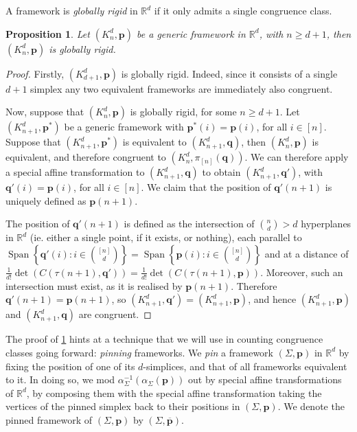 \documentclass[11pt]{amsart}
\newtheorem{proposition}[theorem]{Proposition}
\theoremstyle{definition}
\theoremstyle{remark}
\DeclareMathOperator{\Span}{Span}
\newcommand*{\defn}[1]{{\color{purple}\textit{#1}}}
\begin{document}
A framework is \defn{globally rigid} in $\mathbb{R}^d$ if it only admits a single congruence class.

\begin{proposition}\label{prop:compgr}
    Let $(K_n^d,\mathbf{p})$ be a generic framework in $\mathbb{R}^d$, with $n\geq d+1$, then $(K_n^d,\mathbf{p})$ is globally rigid.
\end{proposition}

\begin{proof}
    Firstly, $(K_{d+1}^d,\mathbf{p})$ is globally rigid.
    Indeed, since it consists of a single $d+1$ simplex any two equivalent frameworks are immediately also congruent.

    Now, suppose that $(K_n^d,\mathbf{p})$ is globally rigid, for some $n\geq d+1$.
    Let $(K_{n+1}^d,\mathbf{p}^*)$ be a generic framework with $\mathbf{p}^*(i)=\mathbf{p}(i)$, for all $i\in[n]$.
    Suppose that $(K_{n+1}^d,\mathbf{p}^*)$ is equivalent to $(K_{n+1}^d,\mathbf{q})$, then $(K_n^d,\mathbf{p})$ is equivalent, and therefore congruent to $(K_n^d,\pi_{[n]}(\mathbf{q}))$.
    We can therefore apply a special affine transformation to $(K_{n+1}^d,\mathbf{q})$ to obtain $(K_{n+1}^d,\mathbf{q}')$, with $\mathbf{q}'(i)=\mathbf{p}(i)$, for all $i\in [n]$.
    We claim that the position of $\mathbf{q}'(n+1)$ is uniquely defined as $\mathbf{p}(n+1)$.

    The position of $\mathbf{q}'(n+1)$ is defined as the intersection of $\binom{n}{d}>d$ hyperplanes in $\mathbb{R}^d$ (ie. either a single point, if it exists, or nothing), each parallel to $\Span\left\{\mathbf{q}'(i):i\in\binom{[n]}{d}\right\}=\Span\left\{\mathbf{p}(i):i\in\binom{[n]}{d}\right\}$ and at a distance of $\frac{1}{d!}\det(C(\tau (n+1),\mathbf{q}'))=\frac{1}{d!}\det(C(\tau(n+1),\mathbf{p}))$.
    Moreover, such an intersection must exist, as it is realised by $\mathbf{p}(n+1)$.
    Therefore $\mathbf{q}'(n+1)=\mathbf{p}(n+1)$, so $(K_{n+1}^d,\mathbf{q}')=(K_{n+1}^d,\mathbf{p})$, and hence $(K_{n+1}^d,\mathbf{p})$ and $(K_{n+1}^d,\mathbf{q})$ are congruent.
\end{proof}

The proof of \cref{prop:compgr} hints at a technique that we will use in counting congruence classes going forward: \textit{pinning} frameworks.
We \defn{pin} a framework $(\Sigma,\mathbf{p})$ in $\mathbb{R}^d$ by fixing the position of one of its $d$-simplices, and that of all frameworks equivalent to it.
In doing so, we mod $\alpha_{\Sigma}^{-1}(\alpha_{\Sigma}(\mathbf{p}))$ out by special affine transformations of $\mathbb{R}^d$, by composing them with the special affine transformation taking the vertices of the pinned simplex back to their positions in $(\Sigma,\mathbf{p})$.
We denote the pinned framework of $(\Sigma,\mathbf{p})$ by $(\Sigma,\overline{\mathbf{p}})$.
\end{document}
